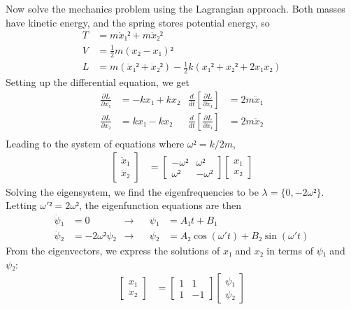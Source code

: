 Now solve the mechanics problem using the Lagrangian approach. Both masses have
kinetic energy, and the spring stores potential energy, so
\begin{align*}
    T &= m{\dot x₁}² + m{\dot x₂}² \\
    V &= \frac 12 m (x₂ - x₁)² \\
    L &= m ({\dot x₁}² + {\dot x₂}²) - \frac 12 k({x₁}² + {x₂}² + 2x₁x₂)
\end{align*}
Setting up the differential equation, we get
\begin{align*}
    \frac{∂L}{∂x₁} &= -kx₁ + kx₂	& \frac{d}{dt}
	\left[\frac{∂L}{∂\dot x₁}\right] &= 2m \ddot x₁ \\
    \frac{∂L}{∂x₂} &=  kx₁ - kx₂	& \frac{d}{dt}
	\left[\frac{∂L}{∂\dot x₁}\right] &= 2m \ddot x₂ \\
\end{align*}
Leading to the system of equations where $ω² = k/2m$,
\begin{align*}
    \begin{bmatrix} \ddot x₁ \\ \ddot x₂ \end{bmatrix} &=
	\begin{bmatrix} -ω² & ω² \\ ω² & -ω² \end{bmatrix}
	\begin{bmatrix} x₁ \\ x₂ \end{bmatrix}
\end{align*}
Solving the eigensystem, we find the eigenfrequencies to be $λ = \{0, -2ω²\}$.
Letting ${ω'}² = 2ω²$, the eigenfunction equations are then
\begin{align*}
    \ddot ψ₁ &= 0
	& \rightarrow&&
	ψ₁ &= A₁t + B₁ \\
    \ddot ψ₂ &= -2ω² ψ₂
	& \rightarrow&&
	ψ₂ &= A₂\cos(ω't) + B₂\sin(ω't)
\end{align*}
From the eigenvectors, we express the solutions of $x₁$ and $x₂$ in terms of
$ψ₁$ and $ψ₂$:
\begin{align*}
    \begin{bmatrix} x₁ \\ x₂ \end{bmatrix} &=
	\begin{bmatrix} 1 & 1 \\ 1 & -1 \end{bmatrix}
	\begin{bmatrix} ψ₁ \\ ψ₂ \end{bmatrix}
\end{align*}
